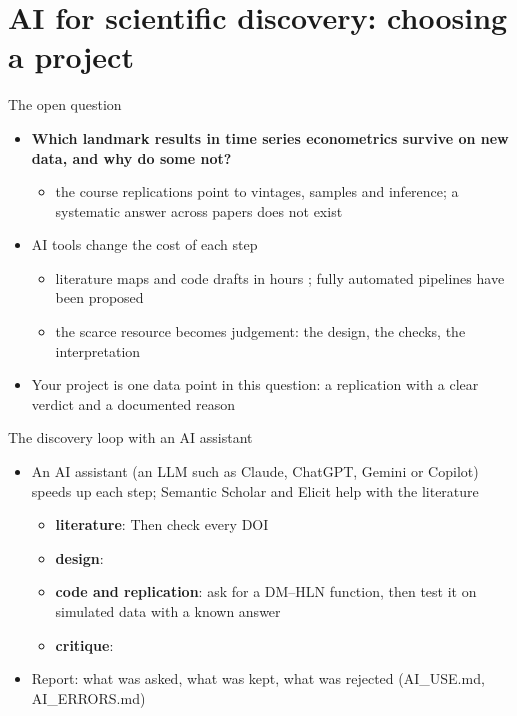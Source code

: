 \section{AI for scientific discovery: choosing a project}

\begin{frame}{The open question}
\itemsize{\small}
\begin{itemize}
    \item \textbf{Which landmark results in time series econometrics survive on new data, and why do some not?}
    \begin{itemize}
        \item the course replications point to vintages, samples and inference; a systematic answer across papers does not exist
    \end{itemize}
    \item AI tools change the cost of each step
    \begin{itemize}
        \item literature maps and code drafts in hours ; fully automated pipelines have been proposed 
        \item the scarce resource becomes judgement: the design, the checks, the interpretation
    \end{itemize}
    \item Your project is one data point in this question: a replication with a clear verdict and a documented reason
\end{itemize}
\end{frame}

\begin{frame}{The discovery loop with an AI assistant}
\itemsize{\footnotesize}
\begin{itemize}
    \item An AI assistant (an LLM such as Claude, ChatGPT, Gemini or Copilot) speeds up each step; Semantic Scholar and Elicit help with the literature
    \begin{itemize}
        \item \textbf{literature}:  Then check every DOI
        \item \textbf{design}: 
        \item \textbf{code and replication}: ask for a DM--HLN function, then test it on simulated data with a known answer
        \item \textbf{critique}: 
    \end{itemize}
    \item Report: what was asked, what was kept, what was rejected (AI\_USE.md, AI\_ERRORS.md)
\end{itemize}
\end{frame}


